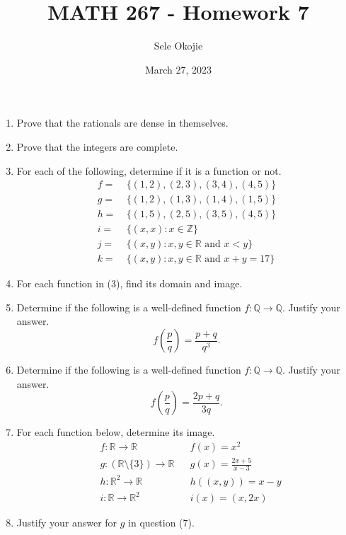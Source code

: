 \documentclass{article}
\title{MATH 267 - Homework 7}
\author{Sele Okojie}
\date{March 27, 2023}
\begin{document}
    \maketitle

    \begin{enumerate}

	\item Prove that the rationals are dense in themselves.

	\item Prove that the integers are complete.

	\item For each of the following, determine if it is a function or not.
		\begin{align*}
			f = & \ \{ (1, 2), (2, 3), (3, 4), (4, 5) \} \\
			g = & \ \{ (1, 2), (1, 3), (1, 4), (1, 5) \} \\
			h = & \ \{ (1, 5), (2, 5), (3, 5), (4, 5) \} \\
			i = & \ \{ (x,x) : x \in \mathbb{Z} \} \\
			j = & \ \{ (x,y) : x, y \in \mathbb{R} \text{ and } x < y \} \\
			k = & \ \{ (x,y) : x, y \in \mathbb{R} \text{ and } x + y = 17 \}
		\end{align*}

	\item For each function in (3), find its domain and image.

	\item Determine if the following is a well-defined function $f : \mathbb{Q} \rightarrow \mathbb{Q}$.  Justify your answer.
		\[
			f \left( \frac{p}{q} \right) = \frac{ p + q }{ q^3 }.
		\]

	\item Determine if the following is a well-defined function $f : \mathbb{Q} \rightarrow \mathbb{Q}$.  Justify your answer.
		\[
			f \left( \frac{p}{q} \right) = \frac{ 2p + q }{ 3q }.
		\]

	\item For each function below, determine its image.
		\begin{align*}
			& f : \mathbb{R} \rightarrow \mathbb{R} & & f(x) = x^2 \\
			& g : (\mathbb{R} \setminus \{ 3 \}) \rightarrow \mathbb{R} & & g(x) = \frac{2x + 5}{x - 3} \\
			& h : \mathbb{R}^2 \rightarrow \mathbb{R} & & h((x,y)) = x - y \\
			& i : \mathbb{R} \rightarrow \mathbb{R}^2 & & i(x) = (x, 2x) 
		\end{align*}

	\item Justify your answer for $g$ in question (7).
    \end{enumerate}
\end{document}
